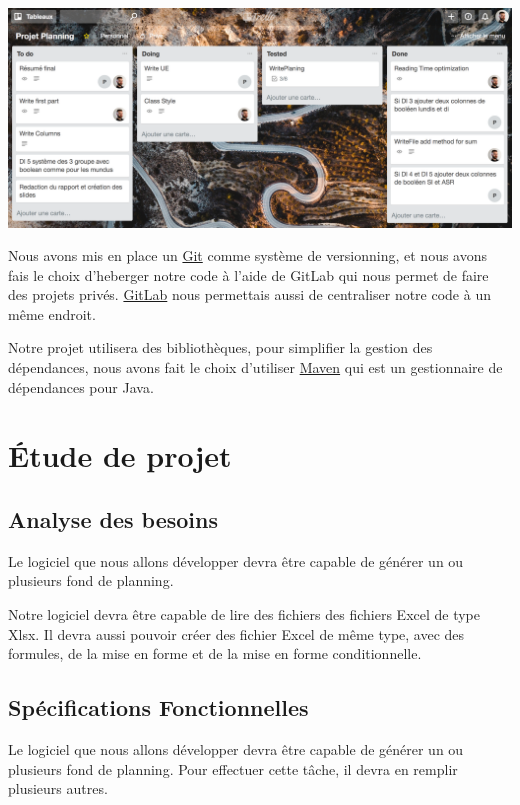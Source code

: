 \documentclass{polytech/polytech}
\begin{document}
	\includegraphics[width=\textwidth]{./img/trello.png}
	
	Nous avons mis en place un \href{https://git-scm.com/}{Git} comme système de versionning, et nous avons fais le choix d'heberger notre code à l'aide de GitLab qui nous permet de faire des projets privés.
	\href{https://about.gitlab.com/}{GitLab} nous permettais aussi de centraliser notre code à un même endroit.

	Notre projet utilisera des bibliothèques, pour simplifier la gestion des dépendances, nous avons fait le choix d'utiliser \href{https://maven.apache.org/}{Maven} qui est un gestionnaire de dépendances pour Java.

	\chapter{Étude de projet}
	\section{Analyse des besoins}

	Le logiciel que nous allons développer devra être capable de générer un ou plusieurs fond de planning.

	Notre logiciel devra être capable de lire des fichiers des fichiers Excel de type Xlsx.
	Il devra aussi pouvoir créer des fichier Excel de même type, avec des formules, de la mise en forme et de la mise en forme conditionnelle.

	\section{Spécifications Fonctionnelles}

	Le logiciel que nous allons développer devra être capable de générer un ou plusieurs fond de planning. Pour effectuer cette tâche, il devra en remplir plusieurs autres.
\end{document}
